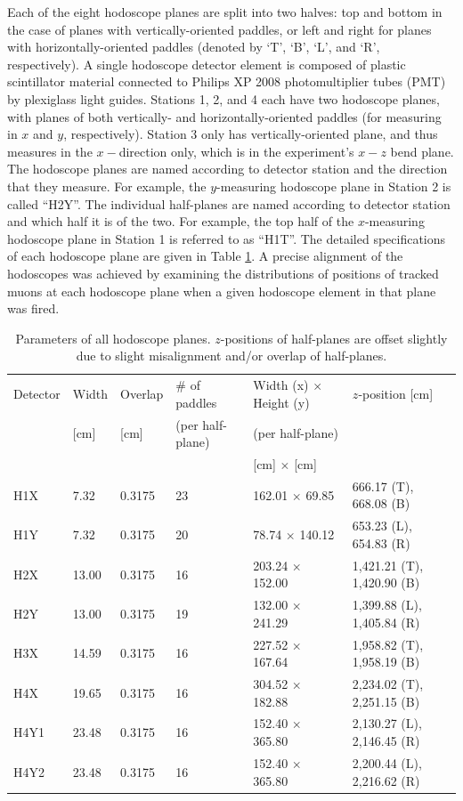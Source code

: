 Each of the eight hodoscope planes are split into two halves: top and bottom in the case of planes with vertically-oriented paddles, or left and right for planes with horizontally-oriented paddles (denoted by `T', `B', `L', and `R', respectively). A single hodoscope detector element is composed of plastic scintillator material connected to Philips XP 2008 photomultiplier tubes (PMT) by plexiglass light guides. Stations 1, 2, and 4 each have two hodoscope planes, with planes of both vertically- and horizontally-oriented paddles (for measuring in $x$ and $y$, respectively). Station 3 only has vertically-oriented plane, and thus measures in the $x-$direction only, which is in the experiment's $x-z$ bend plane. The hodoscope planes are named according to detector station and the direction that they measure. For example, the $y$-measuring hodoscope plane in Station 2 is called ``H2Y''. The individual half-planes are named according to detector station and which half it is of the two. For example, the top half of the $x$-measuring hodoscope plane in Station 1 is referred to as ``H1T''. The detailed specifications of each hodoscope plane are given in Table \ref{tab:hodoscopes}. A precise alignment of the hodoscopes was achieved by examining the distributions of positions of tracked muons at each hodoscope plane when a given hodoscope element in that plane was fired.

\begin{table}[bthp]\centering
  \begin{tabular}{llllll}
    \hline
    \hline
    Detector & Width & Overlap & \# of paddles & Width (x) $\times$ Height (y) & $z$-position [cm] \\
    & [cm] & [cm] & (per half-plane) & (per half-plane) &  \\
    & & & & [cm] $\times$ [cm] & \\
    \hline
    H1X & 7.32 & 0.3175 & 23 & 162.01 $\times$ 69.85 & 666.17 (T), 668.08 (B) \\
    H1Y & 7.32 & 0.3175 & 20 & 78.74 $\times$ 140.12 & 653.23 (L), 654.83 (R) \\
    H2X & 13.00 & 0.3175 & 16 & 203.24 $\times$ 152.00 & 1,421.21 (T), 1,420.90 (B) \\
    H2Y & 13.00 & 0.3175 & 19  & 132.00 $\times$ 241.29 & 1,399.88 (L), 1,405.84 (R) \\
    H3X & 14.59 & 0.3175 & 16  & 227.52 $\times$ 167.64 & 1,958.82 (T), 1,958.19 (B) \\
    H4X & 19.65 & 0.3175 & 16  &  304.52 $\times$ 182.88 & 2,234.02 (T), 2,251.15 (B) \\
    H4Y1 & 23.48 & 0.3175 & 16  & 152.40 $\times$ 365.80 & 2,130.27 (L), 2,146.45 (R) \\
    H4Y2 & 23.48 & 0.3175 & 16  & 152.40 $\times$ 365.80 & 2,200.44 (L), 2,216.62 (R)\\
    \hline
    \hline
  \end{tabular}
  \caption{Parameters of all hodoscope planes. $z$-positions of half-planes are offset slightly due to slight misalignment and/or overlap of half-planes.}
  \label{tab:hodoscopes}
\end{table}

